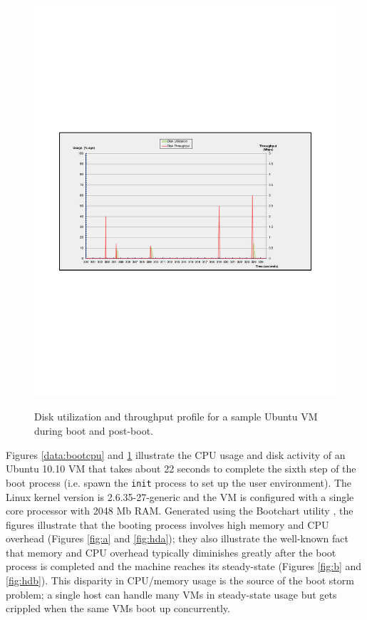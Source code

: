 \begin{figure}
           {\includegraphics[width=\textwidth, trim=2cm 8cm 2cm 8cm]{hd-ss.pdf} \label{fig:hdb}} 
  \caption[Disk utilization and throughput profile for a sample Ubuntu VM during boot and post-boot.]%
          {Disk utilization and throughput profile for a sample Ubuntu VM during boot and post-boot.}
  \label{data:boothd}
\end{figure}

\noindent Figures \ref{data:bootcpu} and \ref{data:boothd}
illustrate the CPU usage and disk activity 
of an Ubuntu 10.10 VM that takes about 22 seconds
to complete the sixth step of the boot process (i.e. spawn 
the \texttt{init} process to set up the user environment).
The Linux kernel version is 2.6.35-27-generic
and the VM is configured with a single core processor
with 2048 Mb RAM. Generated using
the Bootchart utility \cite{mahkovec2005bootchart},
the figures illustrate that
the booting process involves high memory
and CPU overhead (Figures \ref{fig:a} and \ref{fig:hda}); they also 
illustrate the well-known fact that memory and CPU
overhead typically diminishes greatly after the boot
process is completed and the machine reaches
its steady-state (Figures \ref{fig:b} and \ref{fig:hdb}). This disparity
in CPU/memory usage is the source of the boot storm problem;
a single host can handle many VMs in
steady-state usage but gets crippled
when the same VMs boot up concurrently.

